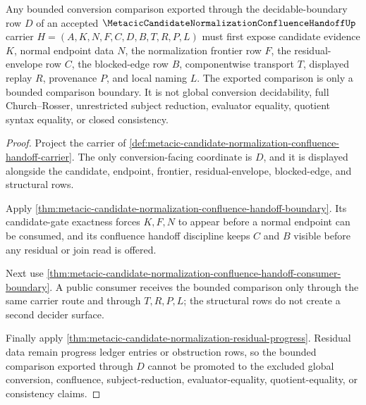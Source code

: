 \begin{theorem}
\label{thm:metacic-candidate-normalization-confluence-handoff-decider-boundary}
Any bounded conversion comparison exported through the decidable-boundary row $D$ of an accepted $\MetacicCandidateNormalizationConfluenceHandoffUp$ carrier $H=(A,K,N,F,C,D,B,T,R,P,L)$ must first expose candidate evidence $K$, normal endpoint data $N$, the normalization frontier row $F$, the residual-envelope row $C$, the blocked-edge row $B$, componentwise transport $T$, displayed replay $R$, provenance $P$, and local naming $L$. The exported comparison is only a bounded comparison boundary. It is not global conversion decidability, full Church--Rosser, unrestricted subject reduction, evaluator equality, quotient syntax equality, or closed consistency.
\end{theorem}
\begin{proof}
Project the carrier of \autoref{def:metacic-candidate-normalization-confluence-handoff-carrier}. The only conversion-facing coordinate is $D$, and it is displayed alongside the candidate, endpoint, frontier, residual-envelope, blocked-edge, and structural rows.

Apply \autoref{thm:metacic-candidate-normalization-confluence-handoff-boundary}. Its candidate-gate exactness forces $K,F,N$ to appear before a normal endpoint can be consumed, and its confluence handoff discipline keeps $C$ and $B$ visible before any residual or join read is offered.

Next use \autoref{thm:metacic-candidate-normalization-confluence-handoff-consumer-boundary}. A public consumer receives the bounded comparison only through the same carrier route and through $T,R,P,L$; the structural rows do not create a second decider surface.

Finally apply \autoref{thm:metacic-candidate-normalization-residual-progress}. Residual data remain progress ledger entries or obstruction rows, so the bounded comparison exported through $D$ cannot be promoted to the excluded global conversion, confluence, subject-reduction, evaluator-equality, quotient-equality, or consistency claims.
\end{proof}

